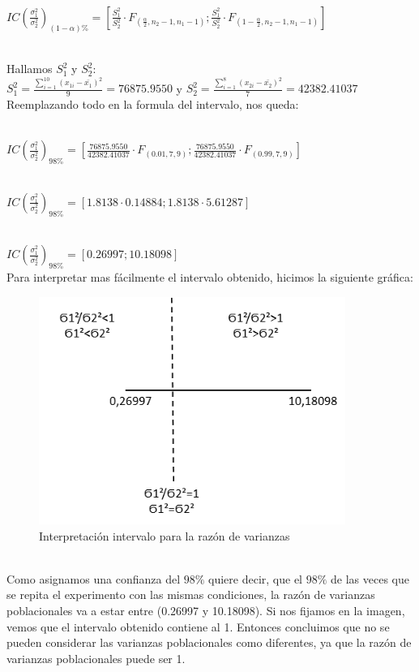 \documentclass[letterpaper,12pt,onecolumn,titlepage]{article}
\begin{document}
~\\ $IC(\frac{\sigma_1^{2}}{\sigma_2^{2}})_{(1-\alpha)\%}=\left[\frac{S_{1} ^{2}}{S_{2} ^{2}}\cdot F_{(\frac{\alpha}{2},n_{2}-1,n_{1}-1)}  ; \frac{S_{1} ^{2}}{S_{2} ^{2}}\cdot F_{(1-\frac{\alpha}{2},n_{2}-1,n_{1}-1)} \right]$

~\\ Hallamos $S_{1}^2$ y $S_{2}^2$:
~\\ $S_{1}^2=\frac{\sum\limits_{i=1}^{10}(x_{1i}-\bar{x_1})^2}{9}=76875.9550$ y $S_{2}^2=\frac{\sum\limits_{i=1}^{8}(x_{2i}-\bar{x_2})^2}{7}=42382.41037$
~\\ Reemplazando todo en la formula del intervalo, nos queda:

~\\ $IC(\frac{\sigma_1^{2}}{\sigma_2^{2}})_{98\%}=\left[\frac{76875.9550}{42382.41037}\cdot F_{(0.01,7,9)}  ; \frac{76875.9550}{42382.41037}\cdot F_{(0.99,7,9)} \right]$

~\\ $IC(\frac{\sigma_1^{2}}{\sigma_2^{2}})_{98\%}=[1.8138\cdot0.14884  ;  1.8138\cdot5.61287]$

~\\ $IC(\frac{\sigma_1^{2}}{\sigma_2^{2}})_{98\%}=[0.26997 ; 10.18098]$
~\\ Para interpretar mas f\'{a}cilmente el intervalo obtenido, hicimos la siguiente gr\'{a}fica:
\begin{figure}[!h]
    \begin{center}
        \includegraphics[width=10cm]{Figuras/Grafico4.png}
        \caption{Interpretaci\'{o}n intervalo para la raz\'{o}n de varianzas}
        \label{fig:Densidad}
    \end{center}
\end{figure}
~\\ Como asignamos una confianza del $98\%$ quiere decir, que el $98\%$ de las veces que se repita el experimento con las mismas condiciones, la raz\'{o}n de varianzas poblacionales va a estar entre (0.26997 y 10.18098). Si nos fijamos en la imagen, vemos que el intervalo obtenido contiene al 1. Entonces concluimos que no se pueden considerar las varianzas poblacionales como diferentes, ya que la raz\'{o}n de varianzas poblacionales puede ser 1.
\end{document}
